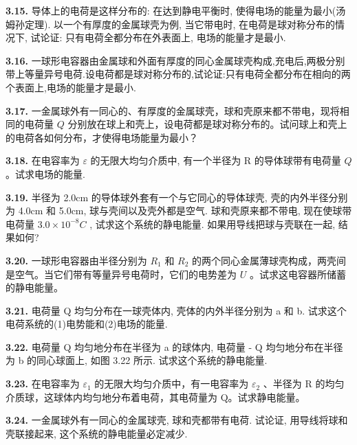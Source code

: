 \textbf{3.15.} 导体上的电荷是这样分布的: 在达到静电平衡时, 使得电场的能量为最小(汤姆孙定理). 以一个有厚度的金属球壳为例, 当它带电时, 在电荷是球对称分布的情况下, 试论证: 只有电荷全都分布在外表面上, 电场的能量才是最小.

\vfill
\newpage

\textbf{3.16.} 一球形电容器由金属球和外面有厚度的同心金属球壳构成,充电后,两极分别带上等量异号电荷.设电荷都是球对称分布的,试论证:只有电荷全都分布在相向的两个表面上,电场的能量才是最小.

\vfill
\newpage

\textbf{3.17.} 一金属球外有一同心的、有厚度的金属球壳，球和壳原来都不带电，现将相同的电荷量 $Q$ 分别放在球上和壳上，设电荷都是球对称分布的。试问球上和壳上的电荷各如何分布，才使得电场能量为最小？

\vfill
\newpage

\textbf{3.18.} 在电容率为 $\varepsilon$ 的无限大均匀介质中, 有一个半径为 R 的导体球带有电荷量 $Q$。试求电场的能量.

\vfill
\newpage

\textbf{3.19.} 半径为 2.0cm 的导体球外套有一个与它同心的导体球壳, 壳的内外半径分别为 4.0cm 和 5.0cm, 球与壳间以及壳外都是空气. 球和壳原来都不带电, 现在使球带电荷量 $3.0 \times 10^{-8}C$ , 试求这个系统的静电能量. 如果用导线把球与壳联在一起, 结果如何?

\vfill
\newpage

\textbf{3.20.} 一球形电容器由半径分别为 $R_{1}$ 和 $R_{2}$ 的两个同心金属薄球壳构成，两壳间是空气。当它们带有等量异号电荷时，它们的电势差为 $U$ 。试求这电容器所储蓄的静电能量。

\vfill
\newpage

\textbf{3.21.} 电荷量 Q 均匀分布在一球壳体内, 壳体的内外半径分别为 a 和 b. 试求这个电荷系统的(1)电势能和(2)电场的能量.

\vfill
\newpage

\textbf{3.22.} 电荷量 Q 均匀地分布在半径为 a 的球体内, 电荷量 - Q 均匀地分布在半径为 b 的同心球面上, 如图 3.22 所示. 试求这个系统的静电能量.

\vfill
\newpage

\textbf{3.23.} 在电容率为 $\varepsilon_{1}$ 的无限大均匀介质中，有一电容率为 $\varepsilon_{2}$ 、半径为 R 的均匀介质球，这球体内均匀地分布着电荷，其电荷量为 Q。试求静电能量。

\vfill
\newpage

\textbf{3.24.} 一金属球外有一同心的金属球壳, 球和壳都带有电荷. 试论证, 用导线将球和壳联接起来, 这个系统的静电能量必定减少.

